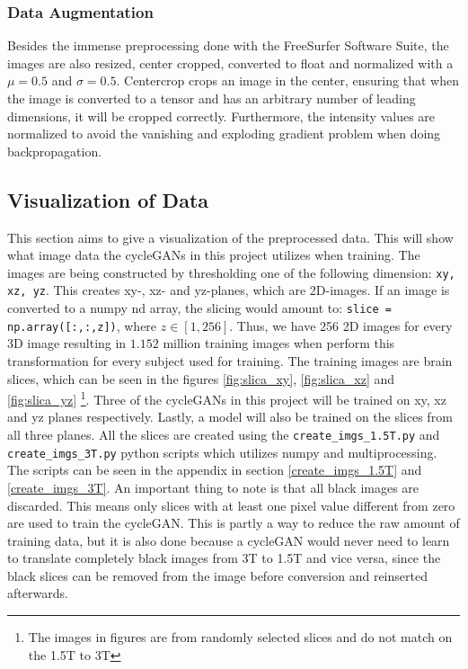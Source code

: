 \documentclass[12pt, fleqn, titlepage]{article}
\begin{document}


\subsubsection{Data Augmentation}

Besides the immense preprocessing done with the FreeSurfer Software Suite, the images are also resized, center cropped, converted to float and normalized with a $ \mu = 0.5 $ and $ \sigma = 0.5$. Centercrop crops an image in the center, ensuring that when the image is converted to a tensor and has an arbitrary number of leading dimensions, it will be cropped correctly. Furthermore, the intensity values are normalized to avoid the vanishing and exploding gradient problem when doing backpropagation.


\subsection{Visualization of Data}
This section aims to give a visualization of the preprocessed data. This will show what image data the cycleGANs in this project utilizes when training. The images are being constructed by thresholding one of the following dimension: \texttt{xy, xz, yz}. This creates xy-, xz- and yz-planes, which are 2D-images. If an image is converted to a numpy nd array, the slicing would amount to: \texttt{slice = np.array([:,:,z])}, where $ z \in [1,256] $. Thus, we have 256 2D images for every 3D image resulting in $ 1.152 $ million training images when perform this transformation for every subject used for training. The training images are brain slices, which can be seen in the figures \ref{fig:slica_xy}, \ref{fig:slica_xz} and \ref{fig:slica_yz} \footnote{The images in figures are from randomly selected slices and do not match on the 1.5T to 3T}. Three of the cycleGANs in this project will be trained on xy, xz and yz planes respectively. Lastly, a model will also be trained on the slices from all three planes. All the slices are created using the \texttt{create\_imgs\_1.5T.py} and \texttt{create\_imgs\_3T.py} python scripts which utilizes numpy and multiprocessing. The scripts can be seen in the appendix in section \ref{create_imgs_1.5T} and \ref{create_imgs_3T}.
An important thing to note is that all black images are discarded. This means only slices with at least one pixel value different from zero are used to train the cycleGAN. This is partly a way to reduce the raw amount of training data, but it is also done because a cycleGAN would never need to learn to translate completely black images from 3T to 1.5T and vice versa, since the black slices can be removed from the image before conversion and reinserted afterwards.
\end{document}
